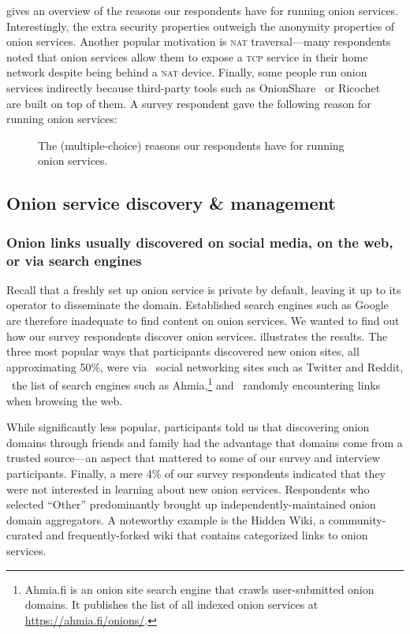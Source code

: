  gives an overview of the reasons our
respondents have for running onion services.  Interestingly, the extra security
properties outweigh the anonymity properties of onion services.  Another popular
motivation is \textsc{nat} traversal---many respondents noted that onion
services allow them to expose a \textsc{tcp} service in their home network
despite being behind a \textsc{nat} device.  Finally, some people run onion
services indirectly because third-party tools such as
OnionShare~\cite{onionshare} or Ricochet~\cite{ricochet} are built on top of
them.  A survey respondent gave the following reason for running onion services:

\begin{figure}[t]
    \centering
    
    \caption{The (multiple-choice) reasons our respondents have for running
    onion services.}
    \label{fig:onion-operation-reasons}
\end{figure}

\subsection{Onion service discovery \& management}
\label{sec:manage}

\subsubsection{Onion links usually discovered on social media, on the web, or via search engines }
Recall that a freshly set up onion service is private by default, leaving it up
to its operator to disseminate the domain.  Established search engines such as
Google are therefore inadequate to find content on onion services.  We wanted to
find out how our survey respondents discover onion services.
 illustrates the results.  The three most popular ways
that participants discovered new onion sites, all approximating 50\%, were via \first~social
networking sites such as Twitter and Reddit, \second~the list of search engines
such as Ahmia,\footnote{Ahmia.fi is an onion site search engine that crawls
user-submitted onion domains.  It publishes the list of all indexed onion
services at \url{https://ahmia.fi/onions/}.} and \third~randomly encountering
links when browsing the web.

While significantly less popular, participants told us that discovering onion domains through friends and
family had the advantage that domains come from a trusted source---an aspect
that mattered to some of our survey and interview participants.  Finally, a mere
4\% of our survey respondents indicated that they were not interested in learning about new onion services.
Respondents who selected ``Other'' predominantly brought up
independently-maintained onion domain aggregators.  A noteworthy example is the
Hidden Wiki, a community-curated and frequently-forked wiki that contains
categorized links to onion services.

